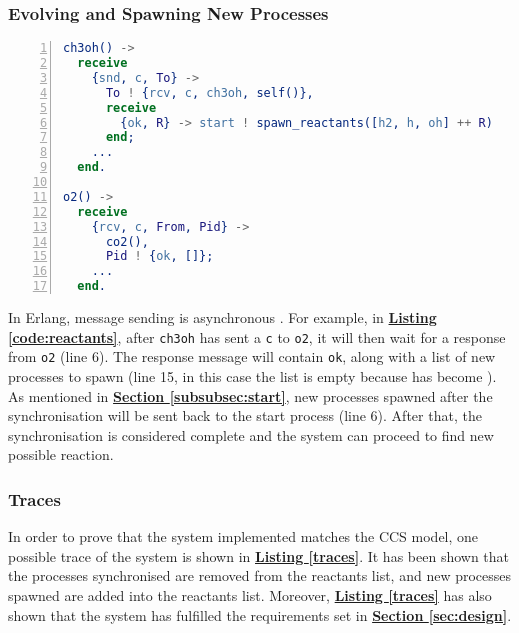 \documentclass[12pt, a4paper]{article}
\begin{document}
\subsubsection{Evolving and Spawning New Processes}
\begin{lstlisting}[language=erlang, basicstyle=\small,numbers=left,label=code:reactants,
  caption=Partial code listing of \texttt{ch3oh} and \texttt{o2}]
ch3oh() ->
  receive
    {snd, c, To} ->
      To ! {rcv, c, ch3oh, self()},
      receive
        {ok, R} -> start ! spawn_reactants([h2, h, oh] ++ R)
      end;
    ...
  end.

o2() ->
  receive
    {rcv, c, From, Pid} ->
      co2(),
      Pid ! {ok, []};
    ...
  end.
\end{lstlisting}

In Erlang, message sending is asynchronous \cite{message_sending}. For example, in
\hyperref[code:reactants]{\textbf{Listing \ref*{code:reactants}}}, after \texttt{ch3oh} has sent a
\texttt{c} to \texttt{o2}, it will then wait for a response from \texttt{o2} (line 6). The response
message will contain \texttt{ok}, along with a list of new processes to spawn (line 15, in this case
the list is empty because  has become ). As mentioned in
\hyperref[subsubsec:start]{\textbf{Section \ref*{subsubsec:start}}}, new processes spawned after the
synchronisation will be sent back to the start process (line 6). After that, the synchronisation is
considered complete and the system can proceed to find new possible reaction.

\subsubsection{Traces}
In order to prove that the system implemented matches the CCS model, one possible trace of the
system is shown in \hyperref[traces]{\textbf{Listing \ref*{traces}}}. It has been shown that the
processes synchronised are removed from the reactants list, and new processes spawned are added into
the reactants list. Moreover, \hyperref[traces]{\textbf{Listing \ref*{traces}}} has also shown that
the system has fulfilled the requirements set in \hyperref[sec:design]{\textbf{Section
\ref*{sec:design}}}.
\end{document}
